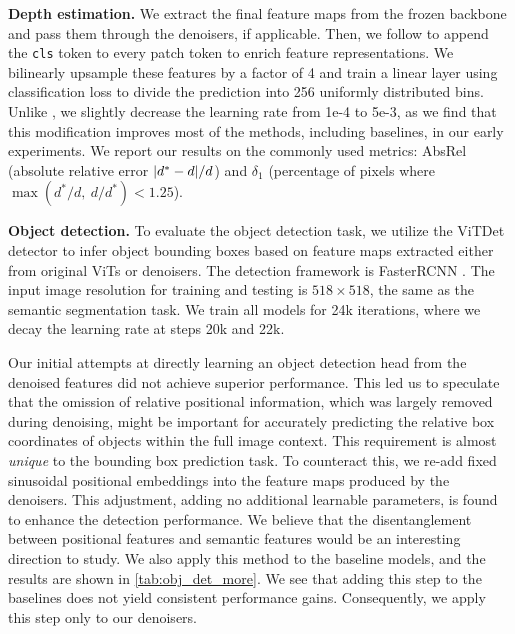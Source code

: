 \documentclass[runningheads]{llncs}
\renewcommand{\paragraph}[1]{\vspace{1.25mm}\noindent\textbf{#1}}
\begin{document}
\paragraph{Depth estimation.} We extract the final feature maps from the frozen backbone and pass them through the denoisers, if applicable. Then, we follow \cite{oquab2023dinov2} to append the \texttt{cls} token to every patch token to enrich feature representations. We bilinearly upsample these features by a factor of 4 and train a linear layer using classification loss to divide the prediction into 256 uniformly distributed bins. Unlike \cite{oquab2023dinov2}, we slightly decrease the learning rate from 1e-4 to 5e-3, as we find that this modification improves most of the methods, including baselines, in our early experiments.
We report our results on the commonly used metrics: AbsRel (absolute relative error $\abs{d^{*} - d}/d$) and $\delta_1$ (percentage of pixels where $\max(d^{*}/d,~ d/d^{*}) < 1.25$).


\paragraph{Object detection.} To evaluate the object detection task, we utilize the ViTDet detector \cite{li2022exploring} to infer object bounding boxes based on feature maps extracted either from original ViTs or denoisers. The detection framework is FasterRCNN \cite{ren2015faster}. The input image resolution for training and testing is $518\times 518$, the same as the semantic segmentation task. We train all models for 24k iterations, where we decay the learning rate at steps 20k and 22k.

Our initial attempts at directly learning an object detection head from the denoised features did not achieve superior performance. This led us to speculate that the omission of relative positional information, which was largely removed during denoising, might be important for accurately predicting the relative box coordinates of objects within the full image context. This requirement is almost \textit{unique} to the bounding box prediction task. To counteract this, we re-add fixed sinusoidal positional embeddings into the feature maps produced by the denoisers. This adjustment, adding no additional learnable parameters, is found to enhance the detection performance. We believe that the disentanglement between positional features and semantic features would be an interesting direction to study. We also apply this method to the baseline models, and the results are shown in \cref{tab:obj_det_more}. We see that adding this step to the baselines does not yield consistent performance gains. Consequently, we apply this step only to our denoisers.
\end{document}
